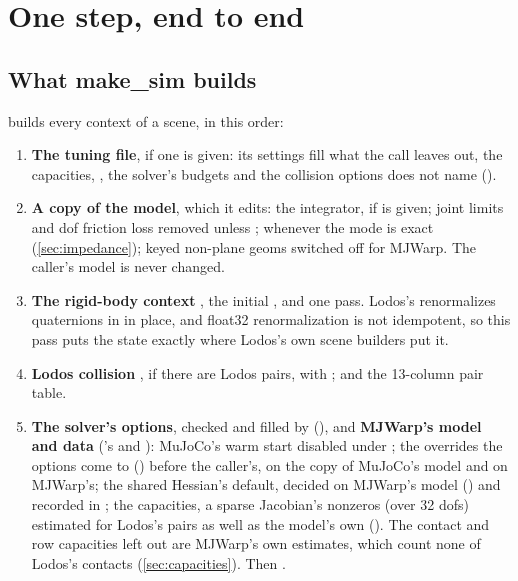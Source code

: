 \section{One step, end to end}\label{sec:step}

\subsection{What make\_sim builds}\label{sec:makesim}

 builds every context of a scene, in this order:

\begin{enumerate}
\item \textbf{The tuning file}, if one is given: its settings fill what the call leaves out, the capacities, , the solver's budgets and the collision options  does not name ().
\item \textbf{A copy of the model}, which it edits: the integrator, if  is given; joint limits and dof friction loss removed unless ;  whenever the mode is exact (\cref{sec:impedance}); keyed non-plane geoms switched off for MJWarp. The caller's model is never changed.
\item \textbf{The rigid-body context} , the initial , and one  pass. Lodos's  renormalizes quaternions in  in place, and float32 renormalization is not idempotent, so this pass puts the state exactly where Lodos's own scene builders put it.
\item \textbf{Lodos collision} , if there are Lodos pairs, with ; and the 13-column pair table.
\item \textbf{The solver's options}, checked and filled by  (), and \textbf{MJWarp's model and data}  ('s  and ): MuJoCo's warm start disabled under ; the overrides the options come to () before the caller's, on the copy of MuJoCo's model and on MJWarp's; the shared Hessian's default, decided on MJWarp's model () and recorded in ; the capacities, a sparse Jacobian's nonzeros (over 32 dofs) estimated for Lodos's pairs as well as the model's own (). The contact and row capacities left out are MJWarp's own estimates, which count none of Lodos's contacts (\cref{sec:capacities}). Then .

\end{enumerate}
